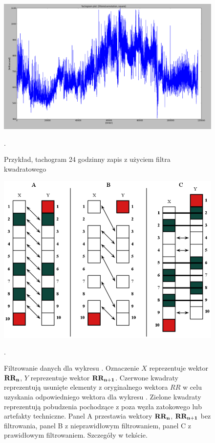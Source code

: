 \begin{figure}
\centering
\includegraphics[scale=0.3]{graph/24h_tachogram_annotated_squared.png}
\caption{Przykład, tachogram 24 godzinny zapis z użyciem filtra kwadratowego}.
\label{fig:24h_tachogram_annotated_squared}
\end{figure}

\begin{figure}
\centering
\includegraphics[scale=0.5]{graph/filtr_ewolucja.png}
\caption{Filtrowanie danych dla wykresu \PP{}. Oznaczenie $X$ reprezentuje wektor $\mathbf{RR_n}$,
$Y$ reprezentuje wektor $\mathbf{RR_{n+1}}$. Czerwone kwadraty reprezentują usunięte elementy z oryginalnego wektora $RR$ w celu uzyskania odpowiedniego wektora dla wykresu \PP{}.
Zielone kwadraty reprezentują pobudzenia pochodzące z poza węzła zatokowego lub artefakty techniczne. Panel A przestawia wektory $\mathbf{RR_n}$, $\mathbf{RR_{n+1}}$ bez filtrowania, panel B z nieprawidłowym filtrowaniem, panel C z prawidłowym filtrowaniem. Szczegóły w tekście.}.
\label{fig:filtr_ewolucja}
\end{figure}

